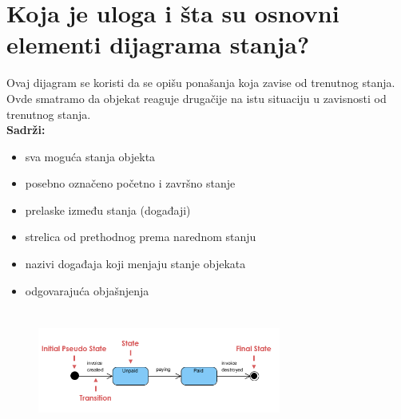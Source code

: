 \documentclass[a4paper]{article}
\begin{document}
\section{Koja je uloga i šta su osnovni elementi dijagrama stanja?}
  Ovaj dijagram se koristi da se opišu ponašanja koja zavise od trenutnog stanja. Ovde smatramo
  da objekat reaguje drugačije na istu situaciju u zavisnosti od trenutnog stanja.\\ 
  \textbf{Sadrži:}
  \begin{itemize}
    \item sva moguća stanja objekta
    \item posebno označeno početno i završno stanje
    \item prelaske između stanja (događaji)
    \item strelica od prethodnog prema narednom stanju
    \item nazivi događaja koji menjaju stanje objekata
    \item odgovarajuća objašnjenja
  \end{itemize}
  \begin{figure}[H]
    \begin{center}
        \includegraphics[width=80mm,height=40mm]{Slike/uml_stanja.png}
    \end{center}
  \end{figure} 
\end{document}
